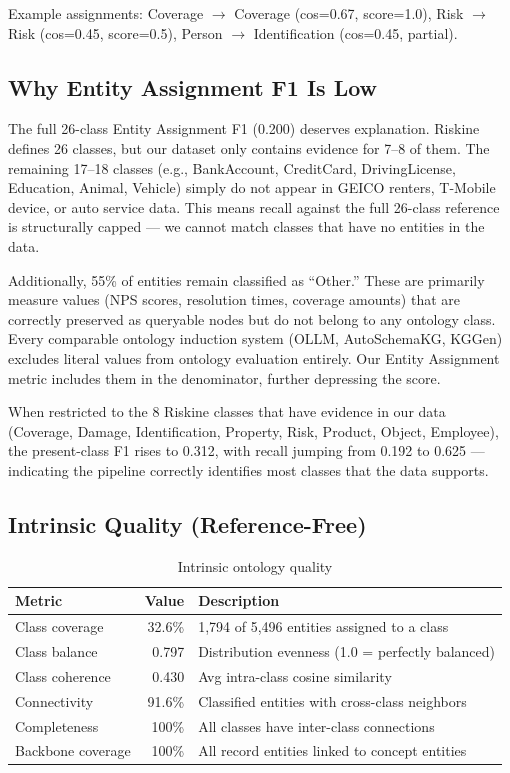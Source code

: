 \documentclass[11pt]{article}
\begin{document}
Example assignments: Coverage $\rightarrow$ Coverage (cos=0.67, score=1.0), Risk $\rightarrow$ Risk (cos=0.45, score=0.5), Person $\rightarrow$ Identification (cos=0.45, partial).

\subsection{Why Entity Assignment F1 Is Low}

The full 26-class Entity Assignment F1 (0.200) deserves explanation. Riskine defines 26 classes, but our dataset only contains evidence for 7--8 of them. The remaining 17--18 classes (e.g., BankAccount, CreditCard, DrivingLicense, Education, Animal, Vehicle) simply do not appear in GEICO renters, T-Mobile device, or auto service data. This means recall against the full 26-class reference is structurally capped --- we cannot match classes that have no entities in the data.

Additionally, 55\% of entities remain classified as ``Other.'' These are primarily measure values (NPS scores, resolution times, coverage amounts) that are correctly preserved as queryable nodes but do not belong to any ontology class. Every comparable ontology induction system (OLLM, AutoSchemaKG, KGGen) excludes literal values from ontology evaluation entirely. Our Entity Assignment metric includes them in the denominator, further depressing the score.

When restricted to the 8 Riskine classes that have evidence in our data (Coverage, Damage, Identification, Property, Risk, Product, Object, Employee), the present-class F1 rises to 0.312, with recall jumping from 0.192 to 0.625 --- indicating the pipeline correctly identifies most classes that the data supports.

\subsection{Intrinsic Quality (Reference-Free)}

\begin{table}[h]
\centering
\caption{Intrinsic ontology quality}
\begin{tabular}{lrl}
\toprule
\textbf{Metric} & \textbf{Value} & \textbf{Description} \\
\midrule
Class coverage & 32.6\% & 1,794 of 5,496 entities assigned to a class \\
Class balance & 0.797 & Distribution evenness (1.0 = perfectly balanced) \\
Class coherence & 0.430 & Avg intra-class cosine similarity \\
Connectivity & 91.6\% & Classified entities with cross-class neighbors \\
Completeness & 100\% & All classes have inter-class connections \\
Backbone coverage & 100\% & All record entities linked to concept entities \\
\bottomrule
\end{tabular}
\end{table}
\end{document}
